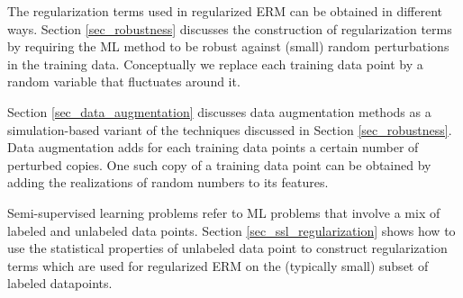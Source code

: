 \documentclass[12pt]{report}
\begin{document}


The regularization terms used in regularized ERM can be obtained in different ways. 
Section \ref{sec_robustness} discusses the construction of regularization terms 
by requiring the ML method to be robust against (small) random perturbations in 
the training data. Conceptually we replace each training data point by a random 
variable that fluctuates around it. 

Section \ref{sec_data_augmentation} discusses data augmentation methods as 
a simulation-based variant of the techniques discussed in Section \ref{sec_robustness}. 
Data augmentation adds for each training data points a certain number of perturbed 
copies. One such copy of a training data point can be obtained by adding the 
realizations of random numbers to its features. 

Semi-supervised learning problems refer to ML problems that involve a mix of 
labeled and unlabeled data points. Section \ref{sec_ssl_regularization} shows 
how to use the statistical properties of unlabeled data point to construct 
regularization terms which are used for regularized ERM on the (typically small) 
subset of labeled datapoints. 
\end{document}
